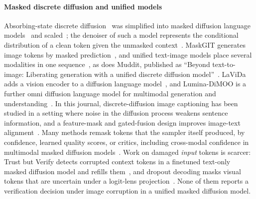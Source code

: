 \paragraph*{Masked discrete diffusion and unified models}
Absorbing-state discrete diffusion~\cite{austin2021d3pm,lou2024sedd} was simplified into masked diffusion language
models~\cite{sahoo2024mdlm} and scaled~\cite{nie2025llada}; the denoiser of such a model represents the conditional distribution of a
clean token given the unmasked context~\cite{ou2025radd}.
MaskGIT generates image tokens by masked prediction~\cite{chang2022maskgit}, and unified text-image models place several modalities in one
sequence~\cite{swerdlow2025unidisc,yang2025mmada,li2026omnidiffusion}, as does Muddit, published as ``Beyond text-to-image: Liberating
generation with a unified discrete diffusion model''~\cite{shi2025muddit}.
LaViDa adds a vision encoder to a diffusion language model~\cite{li2025lavida}, and Lumina-DiMOO is a further omni diffusion language
model for multimodal generation and understanding~\cite{xin2025luminadimoo}.
In this journal, discrete-diffusion image captioning has been studied in a setting where noise in the diffusion process weakens
sentence information, and a feature-mask and gated-fusion design improves image-text alignment~\cite{yang2026malfm}.
Many methods remask tokens that the sampler itself produced, by confidence, learned quality scores, or critics, including
cross-modal confidence in multimodal masked diffusion models~\cite{wang2025remdm,zhai2026core,kim2025prism,schiff2026proseco,lezama2022tokencritic,ouyang2026freecorrection,le2026co2jump}.
Work on damaged \emph{input} tokens is scarcer: Trust but Verify detects corrupted context tokens in a finetuned text-only masked
diffusion model and refills them~\cite{jhingran2026trustverify}, and dropout decoding masks visual tokens that are uncertain under a
logit-lens projection~\cite{fang2025dropout}.
None of them reports a verification decision under image corruption in a unified masked diffusion model.

